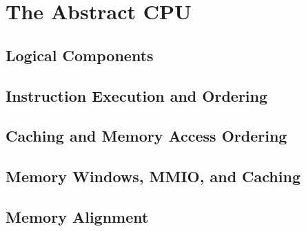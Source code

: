 
\chapter{The Abstract CPU}
\label{chp:The Abstract CPU}

\section{Logical Components}
\label{sec:cpu:Logical Components}

\section{Instruction Execution and Ordering}
\label{sec:cpu:Instruction Execution and Ordering}

\section{Caching and Memory Access Ordering}
\label{sec:cpu:Caching and Memory Access Ordering}

\section{Memory Windows, MMIO, and Caching}
\label{sec:cpu:Memory Windows, MMIO, and Caching}

\section{Memory Alignment}
\label{sec:cpu:Memory Alignment}
